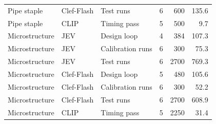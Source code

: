 \begin{table}
\begin{tabular}[t]{lllrrr}
Pipe staple & Clef-Flash & Test runs & 6 & 600 & 135.6\\
\addlinespace
Pipe staple & CLIP & Timing pass & 5 & 500 & 9.7\\
Microstructure & JEV & Design loop & 4 & 384 & 107.3\\
Microstructure & JEV & Calibration runs & 6 & 300 & 75.3\\
Microstructure & JEV & Test runs & 6 & 2700 & 769.3\\
Microstructure & Clef-Flash & Design loop & 5 & 480 & 105.6\\
\addlinespace
Microstructure & Clef-Flash & Calibration runs & 6 & 300 & 52.2\\
Microstructure & Clef-Flash & Test runs & 6 & 2700 & 608.9\\
Microstructure & CLIP & Timing pass & 5 & 2250 & 31.4\\
\bottomrule
\end{tabular}
\end{table}
